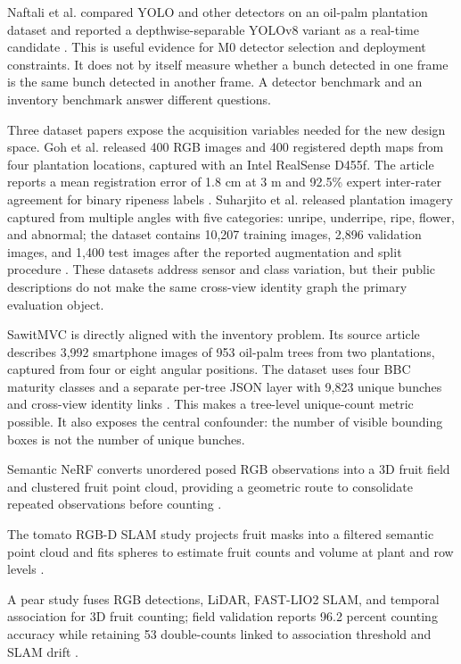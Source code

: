 Naftali et al. compared YOLO and other detectors on an oil-palm plantation dataset and reported a depthwise-separable YOLOv8 variant as a real-time candidate \cite{naftali2024palmcounter}. This is useful evidence for M0 detector selection and deployment constraints. It does not by itself measure whether a bunch detected in one frame is the same bunch detected in another frame. A detector benchmark and an inventory benchmark answer different questions.

Three dataset papers expose the acquisition variables needed for the new design space. Goh et al. released 400 RGB images and 400 registered depth maps from four plantation locations, captured with an Intel RealSense D455f. The article reports a mean registration error of 1.8 cm at 3 m and 92.5\% expert inter-rater agreement for binary ripeness labels \cite{goh2025palmdataset}. Suharjito et al. released plantation imagery captured from multiple angles with five categories: unripe, underripe, ripe, flower, and abnormal; the dataset contains 10,207 training images, 2,896 validation images, and 1,400 test images after the reported augmentation and split procedure \cite{suharjito2025palmdataset}. These datasets address sensor and class variation, but their public descriptions do not make the same cross-view identity graph the primary evaluation object.

SawitMVC is directly aligned with the inventory problem. Its source article describes 3,992 smartphone images of 953 oil-palm trees from two plantations, captured from four or eight angular positions. The dataset uses four BBC maturity classes and a separate per-tree JSON layer with 9,823 unique bunches and cross-view identity links \cite{indriani2026sawitmvc}. This makes a tree-level unique-count metric possible. It also exposes the central confounder: the number of visible bounding boxes is not the number of unique bunches.

Semantic NeRF converts unordered posed RGB observations into a 3D fruit field and clustered fruit point cloud, providing a geometric route to consolidate repeated observations before counting \cite{ledger_m_1210e3ea00486b68}.

The tomato RGB-D SLAM study projects fruit masks into a filtered semantic point cloud and fits spheres to estimate fruit counts and volume at plant and row levels \cite{ledger_r_b2e0e9aabad17a97}.

A pear study fuses RGB detections, LiDAR, FAST-LIO2 SLAM, and temporal association for 3D fruit counting; field validation reports 96.2 percent counting accuracy while retaining 53 double-counts linked to association threshold and SLAM drift \cite{ledger_r_d4270ea8ab11f268}.

